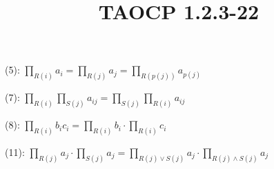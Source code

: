 \documentclass{article}
\title{TAOCP 1.2.3\mbox{-}22}
\begin{document}
\maketitle

(5): \( \prod_{R(i)} a_{i} = \prod_{R(j)} a_{j} = \prod_{R(p(j))} a_{p(j)} \)

(7): \( \prod_{R(i)}\prod_{S(j)} a_{ij} = \prod_{S(j)}\prod_{R(i)} a_{ij} \)

(8): \( \prod_{R(i)} b_{i}c_{i} = \prod_{R(i)} b_{i} \cdot \prod_{R(i)} c_{i} \)

(11): \( \prod_{R(j)} a_{j} \cdot \prod_{S(j)} a_{j} = \prod_{R(j) \lor S(j)} a_{j} \cdot \prod_{R(j) \land S(j)} a_{j} \)
\end{document}
